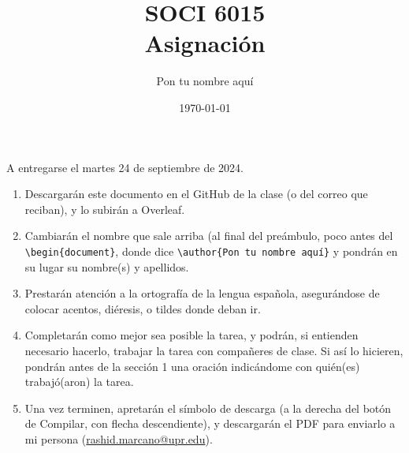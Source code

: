 \documentclass[12pt]{article}
\title{SOCI 6015\\ Asignación \textnumero 4}
\author{Pon tu nombre aquí}
\date{\today}
\begin{document}
\maketitle
\vspace{-1cm}
\begin{center}
   A entregarse el martes 24 de septiembre de 2024. 
\end{center}

\begin{enumerate}
    \item Descargarán este documento en el GitHub de la clase (o del correo que reciban), y lo subirán a Overleaf.
    \item Cambiarán el nombre que sale arriba (al final del preámbulo, poco antes del \texttt{\textbackslash begin\{document\}}, donde dice \texttt{\textbackslash author\{Pon tu nombre aquí\}} y pondrán en su lugar su nombre(s) y apellidos.
    \item Prestarán atención a la ortografía de la lengua española, asegurándose de colocar acentos, diéresis, o tildes donde deban ir. %
    \item Completarán como mejor sea posible la tarea, y podrán, si entienden necesario hacerlo, trabajar la tarea con compañeres de clase. Si así lo hicieren, pondrán antes de la sección 1 una oración indicándome con quién(es) trabajó(aron) la tarea. %
    \item  Una vez terminen, apretarán el símbolo de descarga (a la derecha del botón de Compilar, con flecha descendiente), y descargarán el PDF para enviarlo a mi persona (\href{mailto:rashid.marcano@upr.edu}{rashid.marcano@upr.edu}).

\end{enumerate}
\end{document}
